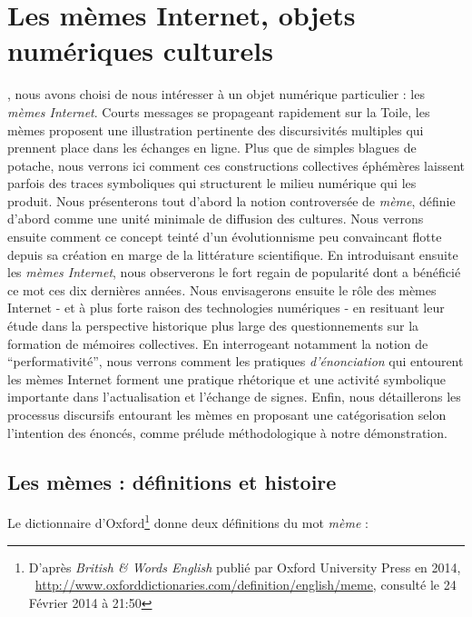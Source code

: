 \chapter[Les mèmes Internet, objets numériques culturels]{Les mèmes Internet, objets numériques culturels}

, nous avons choisi de nous intéresser à un objet numérique particulier : les \textit{mèmes Internet}. Courts messages se propageant rapidement sur la Toile, les mèmes proposent une illustration pertinente des discursivités multiples qui prennent place dans les échanges en ligne. Plus que de simples blagues de potache, nous verrons ici comment ces constructions collectives éphémères laissent parfois des traces symboliques qui structurent le milieu numérique qui les produit. Nous présenterons tout d{\textquoteright}abord la notion controversée de \textit{mème}, définie d{\textquoteright}abord comme une unité minimale de diffusion des cultures. Nous verrons ensuite comment ce concept teinté d{\textquoteright}un évolutionnisme peu convaincant flotte depuis sa création en marge de la littérature scientifique. En introduisant ensuite les \textit{mèmes Internet}, nous observerons le fort regain de popularité dont a bénéficié ce mot ces dix dernières années\textit{. }Nous envisagerons ensuite le rôle des mèmes Internet - et à plus forte raison des technologies numériques - en resituant leur étude dans la perspective historique plus large des questionnements sur la formation de mémoires collectives. En interrogeant notamment la notion de {\textquotedblleft}performativité{\textquotedblright}, nous verrons comment les pratiques \textit{d{\textquoteright}énonciation }qui entourent les mèmes Internet forment une pratique rhétorique et une activité symbolique importante dans l{\textquoteright}actualisation et l{\textquoteright}échange de signes. Enfin, nous détaillerons les processus discursifs entourant les mèmes en proposant une catégorisation selon l{\textquoteright}intention des énoncés, comme prélude méthodologique à notre démonstration.

\section[Les mèmes : définitions et histoire ]{Les mèmes : définitions et histoire } 

Le dictionnaire d{\textquoteright}Oxford\footnote{ D{\textquoteright}après \textit{British \& Words English} publié par Oxford University Press en 2014, \ \url{http://www.oxforddictionaries.com/definition/english/meme}, consulté le 24 Février 2014 à 21:50} donne deux définitions du mot \textit{mème }: 

